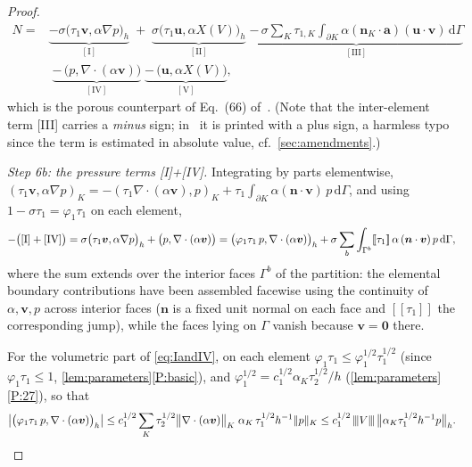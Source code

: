 \documentclass[11pt,a4paper]{article}
\newcommand{\bu}{\boldsymbol{u}}
\newcommand{\bv}{\boldsymbol{v}}
\newcommand{\ba}{\boldsymbol{a}}
\newcommand{\bn}{\boldsymbol{n}}
\newcommand{\X}{X}
\newcommand{\dd}{\,\mathrm{d}}
\newcommand{\jump}[1]{[\![#1]\!]}
\DeclarePairedDelimiter{\norm}{\lVert}{\rVert}
\newcommand{\triplenorm}[1]{{\lvert\kern-0.25ex\lvert\kern-0.25ex\lvert #1
\rvert\kern-0.25ex\rvert\kern-0.25ex\rvert}}
\theoremstyle{plain}
\theoremstyle{remark}
\theoremstyle{definition}
\numberwithin{equation}{section}
\begin{document}
\begin{proof}
\begin{align}
  N ={}& \underbrace{-\sigma\bigl(\tau_1\bv,\alpha\nabla p\bigr)_h}_{\mathrm{[I]}}
  \;+\; \underbrace{\sigma\bigl(\tau_1\bu,\alpha\X(V)\bigr)_h}_{\mathrm{[II]}}
  \;\underbrace{-\,\sigma\sum_{K}\tau_{1,K}\int_{\partial K}
  \alpha(\bn_K\cdot\ba)(\bu\cdot\bv)\dd\Gamma}_{\mathrm{[III]}}
  \nonumber\\
  &\;\underbrace{-\,\bigl(p,\nabla\cdot(\alpha\bv)\bigr)}_{\mathrm{[IV]}}
  \;\underbrace{-\,\bigl(\bu,\alpha\X(V)\bigr)}_{\mathrm{[V]}} ,
  \label{eq:fiveterms}
\end{align}
which is the porous counterpart of Eq.~(66) of~\cite{codina2001}. (Note that the
inter-element term [III] carries a \emph{minus} sign; in~\cite{codina2001} it is printed
with a plus sign, a harmless typo since the term is estimated in absolute value, cf.\
\cref{sec:amendments}.)

\smallskip\noindent\emph{Step 6b: the pressure terms \textup{[I]+[IV]}.}
Integrating by parts elementwise, $(\tau_1\bv,\alpha\nabla p)_K
= -(\tau_1\nabla\cdot(\alpha\bv),p)_K
+ \tau_{1}\int_{\partial K}\alpha(\bn\cdot\bv)\,p\dd\Gamma$, and using
$1-\sigma\tau_{1}=\varphi_{1}\tau_{1}$ on each element,
\begin{equation}\label{eq:IandIV}
  -\bigl(\textup{[I]}+\textup{[IV]}\bigr)
  = \sigma\bigl(\tau_1\bv,\alpha\nabla p\bigr)_h
  + \bigl(p,\nabla\cdot(\alpha\bv)\bigr)
  = \bigl(\varphi_1\tau_1\,p,\nabla\cdot(\alpha\bv)\bigr)_h
  + \sigma\sum_{b}\int_{\Gamma^b}\jump{\tau_1}\,\alpha\,(\bn\cdot\bv)\,p\dd\Gamma,
\end{equation}
where the sum extends over the interior faces $\Gamma^b$ of the partition: the elemental
boundary contributions have been assembled facewise using the continuity of
$\alpha,\bv,p$ across interior faces ($\bn$ is a fixed unit normal on each face and
$\jump{\tau_1}$ the corresponding jump), while the faces lying on $\Gamma$ vanish because
$\bv=\boldsymbol{0}$ there.

For the volumetric part of \eqref{eq:IandIV}, on each element
$\varphi_1\tau_1\le\varphi_1^{1/2}\tau_1^{1/2}$
(since $\varphi_1\tau_1\le1$, \cref{lem:parameters}\ref{P:basic}), and
$\varphi_1^{1/2}=c_1^{1/2}\alpha_K\tau_2^{1/2}/h$
(\cref{lem:parameters}\ref{P:27}), so that
\begin{equation}\label{eq:volpart}
  \bigl|\bigl(\varphi_1\tau_1\,p,\nabla\cdot(\alpha\bv)\bigr)_h\bigr|
  \le c_1^{1/2}\sum_K
  \tau_2^{1/2}\bigl\lVert\nabla\cdot(\alpha\bv)\bigr\rVert_K\;
  \alpha_K\,\tau_1^{1/2}h^{-1}\norm{p}_K
  \le c_1^{1/2}\,\triplenorm{V}\,
  \bigl\lVert\alpha_K\tau_1^{1/2}h^{-1}p\bigr\rVert_h .
\end{equation}


\end{proof}
\end{document}
